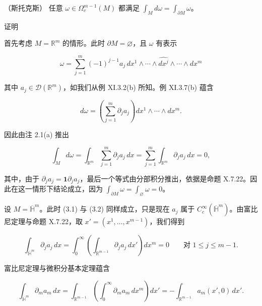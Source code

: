\begin{theorem}

（斯托克斯） 任意 $ \omega \in \Omega_c^{m-1}(M) $ 都满足 $ \int_M d\omega = \int_{\partial M} \omega $。

证明

\begin{subitems}
\item

首先考虑 $ M = \mathbb{R}^m $ 的情形。此时 $ \partial M = \varnothing $，且 $ \omega $ 有表示

\begin{equation}
\omega = \sum_{j=1}^{m} (-1)^{j-1} a_j \, dx^1 \wedge \cdots \wedge \widehat{dx^j} \wedge \cdots \wedge dx^m\tag{3.1}
\end{equation}

其中 $ a_j \in \mathcal{D}(\mathbb{R}^m) $，如我们从例 XI.3.2(b) 所知。例 XI.3.7(b) 蕴含

\begin{equation}
d\omega = \left( \sum_{j=1}^{m} \partial_j a_j \right) dx^1 \wedge \cdots \wedge dx^m.\tag{3.2}
\end{equation}

因此由注 2.1(a) 推出

\[
\int_M d\omega = \int_{\mathbb{R}^m} \sum_{j=1}^{m} \partial_j a_j \, dx = \sum_{j=1}^{m} \int_{\mathbb{R}^m} \partial_j a_j \, dx = 0,
\]

其中，由于 $ \partial_j a_j = \mathbf{1}\partial_j a_j $，最后一个等式由分部积分推出，依据是命题 X.7.22。因此在这一情形下结论成立，因为 $ \int_{\partial M} \omega = \int_\varnothing \omega = 0 $。

\item

设 $ M = \overline{\mathbb{H}}^m $。此时 (3.1) 与 (3.2) 同样成立，只是现在 $ a_j $ 属于 $ C_c^\infty(\overline{\mathbb{H}}^m) $。由富比尼定理与命题 X.7.22，取 $ x' = (x^1, \ldots, x^{m-1}) $，我们得到

\begin{equation}
\int_{\overline{\mathbb{H}}^m} \partial_j a_j \, dx = \int_0^\infty \left( \int_{\mathbb{R}^{m-1}} \partial_j a_j \, dx' \right) dx^m = 0 \qquad \text{对 } 1 \le j \le m-1.\tag{3.3}
\end{equation}

富比尼定理与微积分基本定理蕴含

\begin{equation}
\int_{\overline{\mathbb{H}}^m} \partial_m a_m \, dx = \int_{\mathbb{R}^{m-1}} \left( \int_0^\infty \partial_m a_m \, dx^m \right) dx' = - \int_{\mathbb{R}^{m-1}} a_m(x', 0) \, dx'.\tag{3.4}
\end{equation}


\end{subitems}
\end{theorem}

